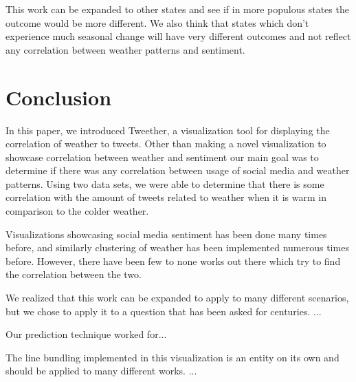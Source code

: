 \documentclass[journal]{vgtc}                %
\begin{document}
This work can be expanded to other states and see if in more populous states the outcome would be more different. We also think that states which don't experience much seasonal change will have very different outcomes and not reflect any correlation between weather patterns and sentiment.



\section{Conclusion}

In this paper, we introduced Tweether, a visualization tool for displaying the correlation of weather to tweets. Other than making a novel visualization to showcase correlation between weather and sentiment our main goal was to determine if there was any correlation between usage of social media and weather patterns. Using two data sets, we were able to determine that there is some correlation with the amount of tweets related to weather when it is warm in comparison to the colder weather. 

Visualizations showcasing social media sentiment has been done many times before, and similarly clustering of weather has been implemented numerous times before. However, there have been few to none works out there which try to find the correlation between the two. 

We realized that this work can be expanded to apply to many different scenarios, but we chose to apply it to a question that has been asked for centuries. ...

Our prediction technique worked for...

The line bundling implemented in this visualization is an entity on its own and should be applied to many different works. ...





\newpage



\nocite{*}

\end{document}

